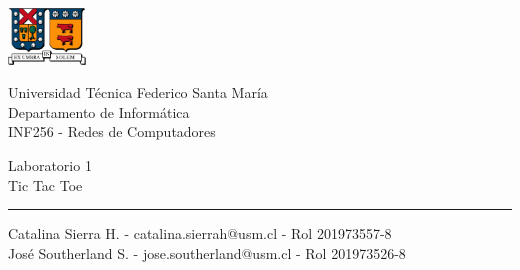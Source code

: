 \documentclass[a4paper,11pt]{article}
\begin{document}

\thispagestyle{empty} %

  \begin{minipage}{.2\linewidth}
    \begin{flushleft}
      \includegraphics[height = 1.5cm]{Imagenes/UTFSM.jpg}
    \end{flushleft}
  \end{minipage}
  \hfill
  \begin{minipage}{.7\linewidth}
    \begin{flushright}
        Universidad Técnica Federico Santa María \\
        Departamento de Informática\\
        INF256 - Redes de Computadores\\
    \end{flushright}
  \end{minipage}

\vfill %
\begin{center}
	{\Large Laboratorio 1\\}
	{\huge Tic Tac Toe\\}
	\vspace{.5cm}
	\hrule
	\vspace{.5cm}
    {\large Catalina Sierra H.} - catalina.sierrah@usm.cl - Rol 201973557-8\\
	{\large José Southerland S.} - jose.southerland@usm.cl - Rol 201973526-8\\
	
\end{center}
\vfill
\newpage
\tableofcontents
\newpage
\end{document}
